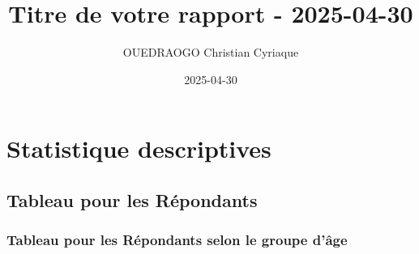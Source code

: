 \documentclass[
]{article}
\title{Titre de votre rapport - 2025-04-30}
\author{OUEDRAOGO Christian Cyriaque}
\date{2025-04-30}
\begin{document}
\maketitle

{
\setcounter{tocdepth}{3}
\tableofcontents
}
\hypertarget{statistique-descriptives}{%
\section{Statistique descriptives}\label{statistique-descriptives}}

\vspace{1cm}

\hypertarget{tableau-pour-les-ruxe9pondants}{%
\subsection{Tableau pour les
Répondants}\label{tableau-pour-les-ruxe9pondants}}

\vspace{1cm}

\hypertarget{tableau-pour-les-ruxe9pondants-selon-le-groupe-duxe2ge}{%
\subsubsection{Tableau pour les Répondants selon le groupe
d'âge}\label{tableau-pour-les-ruxe9pondants-selon-le-groupe-duxe2ge}}
\end{document}
